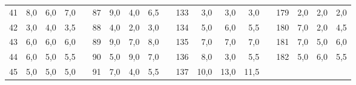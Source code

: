 \begin{table}[H]
{\begin{tabular}{|r|r|r|r|l|r|r|r|r|l|r|r|r|r|lrrrr}
41                               & 8,0                          & 6,0                          & 7,0                          &  & 87 & 9,0  & 4,0  & 6,5  &  & 133 & 3,0  & 3,0  & 3,0  & \multicolumn{1}{l|}{} & \multicolumn{1}{r|}{179} & \multicolumn{1}{r|}{2,0}  & \multicolumn{1}{r|}{2,0}  & \multicolumn{1}{r|}{2,0}  \\ \cline{1-4} \cline{6-9} \cline{11-14} \cline{16-19} 
42                               & 3,0                          & 4,0                          & 3,5                          &  & 88 & 4,0  & 2,0  & 3,0  &  & 134 & 5,0  & 6,0  & 5,5  & \multicolumn{1}{l|}{} & \multicolumn{1}{r|}{180} & \multicolumn{1}{r|}{7,0}  & \multicolumn{1}{r|}{2,0}  & \multicolumn{1}{r|}{4,5}  \\ \cline{1-4} \cline{6-9} \cline{11-14} \cline{16-19} 
43                               & 6,0                          & 6,0                          & 6,0                          &  & 89 & 9,0  & 7,0  & 8,0  &  & 135 & 7,0  & 7,0  & 7,0  & \multicolumn{1}{l|}{} & \multicolumn{1}{r|}{181} & \multicolumn{1}{r|}{7,0}  & \multicolumn{1}{r|}{5,0}  & \multicolumn{1}{r|}{6,0}  \\ \cline{1-4} \cline{6-9} \cline{11-14} \cline{16-19} 
44                               & 6,0                          & 5,0                          & 5,5                          &  & 90 & 5,0  & 9,0  & 7,0  &  & 136 & 8,0  & 3,0  & 5,5  & \multicolumn{1}{l|}{} & \multicolumn{1}{r|}{182} & \multicolumn{1}{r|}{5,0}  & \multicolumn{1}{r|}{6,0}  & \multicolumn{1}{r|}{5,5}  \\ \cline{1-4} \cline{6-9} \cline{11-14} \cline{16-19} 
45                               & 5,0                          & 5,0                          & 5,0                          &  & 91 & 7,0  & 4,0  & 5,5  &  & 137 & 10,0 & 13,0 & 11,5 &                       & \multicolumn{1}{l}{}     & \multicolumn{1}{l}{}      & \multicolumn{1}{l}{}      & \multicolumn{1}{l}{}      \\ \cline{1-4} \cline{6-9} \cline{11-14}
\end{tabular}%
}
\end{table}